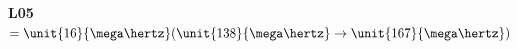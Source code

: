 \documentclass[a4paper,12pt]{article}
\begin{document}
\begin{center}
                                                                                                                                                                                                                                                                                                                                                                                                                                                                                                                                                                                                                                                                                                                                                                                                                                                                                                                                                                                                                                                                                                                                                                                                                                                                                                                                                                                                                                                                                                                                                                                                                                                                                                                                                                                                                                                                                                                                                                                                                                                                                                                                                                                                                                                                                                                                                                                                                                                             \bf{L05} $= \unit{16}{\mega\hertz} (\unit{138}{\mega\hertz} \to \unit{167}{\mega\hertz})$


\end{center}
\end{document}
